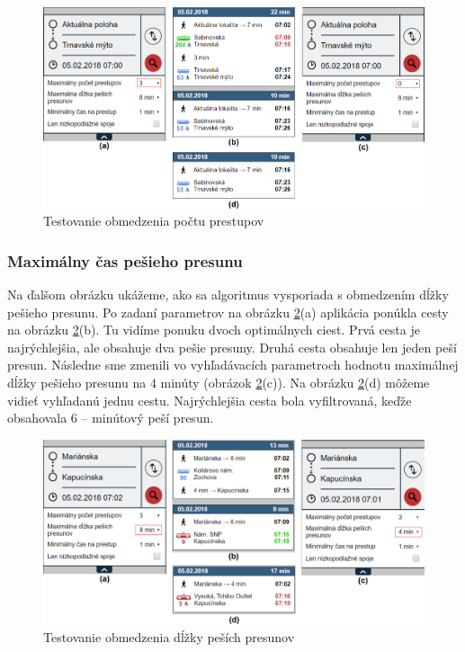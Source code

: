 \begin{figure}[H]
\centerline{\includegraphics[width=1.0\textwidth]{images/test/max-transfers-act}}
\caption[Testovanie obmedzenia počtu prestupov]{Testovanie obmedzenia počtu prestupov}
\label{fig:test-max-transfers}
\end{figure}

\subsubsection{Maximálny čas pešieho presunu}
Na ďalšom obrázku ukážeme, ako sa algoritmus vysporiada s obmedzením dĺžky pešieho presunu. Po zadaní parametrov na obrázku \ref{fig:test-max-walking}(a) aplikácia ponúkla cesty na obrázku \ref{fig:test-max-walking}(b). Tu vidíme ponuku dvoch optimálnych ciest. Prvá cesta je najrýchlejšia, ale obsahuje dva pešie presuny. Druhá cesta obsahuje len jeden peší presun. 
Následne sme zmenili vo vyhľadávacích parametroch hodnotu maximálnej dĺžky pešieho presunu na $4$ minúty (obrázok \ref{fig:test-max-walking}(c)). Na obrázku \ref{fig:test-max-walking}(d) môžeme vidieť vyhľadanú jednu cestu. Najrýchlejšia cesta bola vyfiltrovaná, keďže obsahovala $6$ – minútový peší presun. 

\begin{figure}[H]
\centerline{\includegraphics[width=1.0\textwidth]{images/test/max-walking}}
\caption[Testovanie obmedzenia dĺžky peších presunov]{Testovanie obmedzenia dĺžky peších presunov}
\label{fig:test-max-walking}
\end{figure}


